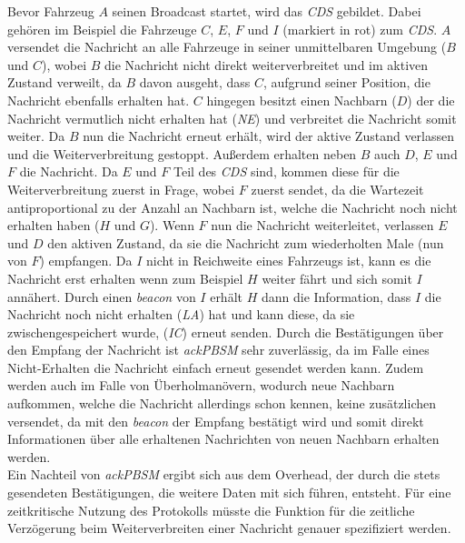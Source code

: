 \documentclass[english,runningheads,a4paper]{llncs}[2018/03/10]
\begin{document}
Bevor Fahrzeug $A$ seinen Broadcast startet, wird das \textit{CDS} gebildet.
Dabei gehören im Beispiel die Fahrzeuge $C$, $E$, $F$ und $I$ (markiert in rot) zum \textit{CDS}.
$A$ versendet die Nachricht an alle Fahrzeuge in seiner unmittelbaren Umgebung ($B$ und $C$), wobei $B$ die Nachricht nicht direkt weiterverbreitet und im aktiven Zustand verweilt, da $B$ davon ausgeht, dass $C$, aufgrund seiner Position, die Nachricht ebenfalls erhalten hat.
$C$ hingegen besitzt einen Nachbarn ($D$) der die Nachricht vermutlich nicht erhalten hat (\textit{NE}) und verbreitet die Nachricht somit weiter.
Da $B$ nun die Nachricht erneut erhält, wird der aktive Zustand verlassen und die Weiterverbreitung gestoppt.
Außerdem erhalten neben $B$ auch $D$, $E$ und $F$ die Nachricht.
Da $E$ und $F$ Teil des \textit{CDS} sind, kommen diese für die Weiterverbreitung zuerst in Frage, wobei $F$ zuerst sendet, da die Wartezeit antiproportional zu der Anzahl an Nachbarn ist, welche die Nachricht noch nicht erhalten haben ($H$ und $G$).
Wenn $F$ nun die Nachricht weiterleitet, verlassen $E$ und $D$ den aktiven Zustand, da sie die Nachricht zum wiederholten Male (nun von $F$) empfangen.
Da $I$ nicht in Reichweite eines Fahrzeugs ist, kann es die Nachricht erst erhalten wenn zum Beispiel $H$ weiter fährt und sich somit $I$ annähert.
Durch einen \textit{beacon} von $I$ erhält $H$ dann die Information, dass $I$ die Nachricht noch nicht erhalten (\textit{LA}) hat und kann diese, da sie zwischengespeichert wurde, (\textit{IC}) erneut senden.
Durch die Bestätigungen über den Empfang der Nachricht ist \textit{ackPBSM} sehr zuverlässig, da im Falle eines Nicht-Erhalten die Nachricht einfach erneut gesendet werden kann.
Zudem werden auch im Falle von Überholmanövern, wodurch neue Nachbarn aufkommen, welche die Nachricht allerdings schon kennen, keine zusätzlichen versendet, da mit den \textit{beacon} der Empfang bestätigt wird und somit direkt Informationen über alle erhaltenen Nachrichten von neuen Nachbarn erhalten werden.\\
Ein Nachteil von \textit{ackPBSM} ergibt sich aus dem Overhead, der durch die stets gesendeten Bestätigungen, die weitere Daten mit sich führen, entsteht.
Für eine zeitkritische Nutzung des Protokolls müsste die Funktion für die zeitliche Verzögerung beim Weiterverbreiten einer Nachricht genauer spezifiziert werden\cite{conti2013mobile}.
\end{document}
